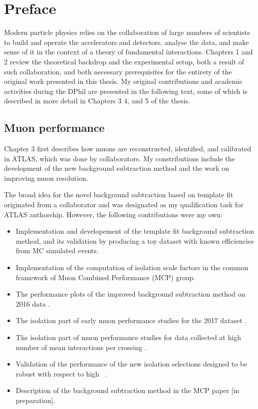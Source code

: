 \chapter*{Preface}

Modern particle physics relies on the collaboration of large
numbers of scientists to build and operate the accelerators and
detectors, analyse the data, and make sense of it in the
context of a theory of fundamental interactions. Chapters 1
and 2 review the theoretical backdrop and the experimental
setup, both a result of such collaboration, and both necessary
prerequisites for the entirety of the original work presented
in this thesis. My original contributions and academic
activities during the DPhil are presented in the following
text, some of which is described in more detail in Chapters 3
4, and 5 of the thesis.

\section*{Muon performance}

Chapter 3 first describes how muons are reconstructed,
identified, and calibrated in ATLAS, which was done by
collaborators. My constributions include the development
of the new background subtraction method and the work on
improving muon resolution.

The broad idea for the novel background subtraction
based on template fit originated from a collaborator and 
was designated as my qualification task for ATLAS authorship.
However, the following contributions were my own:
\begin{itemize}
\item Implementation and developement of the template fit background
subtraction method, and its validation by producing a toy
dataset with known efficiencies from MC simulated events.
\item Implementation of the computation of isolation scale factors in
the common framework of Muon Combined Performance (MCP) group.
\item The performance plots of the improved background
subtraction method on 2016 data \cite{Zgubic:2293041}.
\item The isolation part of early muon performance
studies for the 2017 dataset \cite{Bellomo:2282672}.
\item The isolation part of muon performance
studies for data collected at high number of mean interactions
per crossing \cite{Kohler:2293040}.
\item Validation of the performance of the new isolation
selections designed to be robust with respect to high
\pileup~\cite{Zgubic:2320874}.
\item Description of the background subtraction method in
the MCP paper [in preparation].
\end{itemize}

